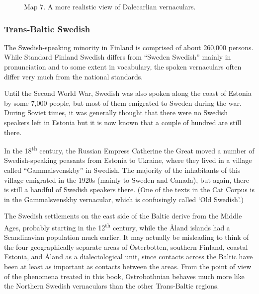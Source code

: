 \begin{figure}[h]
\centering
\begin{minipage}{6.07153in}
\label{bkm:Ref216765095}Map 7. A more realistic view of Dalecarlian vernaculars.
\end{minipage}
\end{figure}
\clearpage\subsubsection[Trans{}-Baltic Swedish]{\rmfamily Trans-Baltic Swedish}
The Swedish-speaking minority in Finland is comprised of about 260,000 persons. While Standard Finland Swedish differs from “Sweden Swedish” mainly in pronunciation and to some extent in vocabulary, the spoken vernaculars often differ very much from the national standards. 

Until the Second World War, Swedish was also spoken along the coast of Estonia by some 7,000 people, but most of them emigrated to Sweden during the war. During Soviet times, it was generally thought that there were no Swedish speakers left in Estonia but it is now known that a couple of hundred are still there.

In the 18\textsuperscript{th} century, the Russian Empress Catherine the Great moved a number of Swedish-speaking peasants from Estonia to Ukraine, where they lived in a village called “Gammalsvenskby” in Swedish. The majority of the inhabitants of this village emigrated in the 1920s (mainly to Sweden and Canada), but again, there is still a handful of Swedish speakers there. (One of the texts in the Cat Corpus is in the Gammalsvenskby vernacular, which is confusingly called  ‘Old Swedish’.)

The Swedish settlements on the east side of the Baltic derive from the Middle Ages, probably starting in the 12\textsuperscript{th} century, while the Åland islands had a Scandinavian population much earlier. It may actually be misleading to think of the four geographically separate areas of Österbotten, southern Finland, coastal Estonia, and Åland as a dialectological unit, since contacts across the Baltic have been at least as important as contacts between the areas. From the point of view of the phenomena treated in this book, Ostrobothnian behaves much more like the Northern Swedish vernaculars than the other Trans-Baltic regions.

